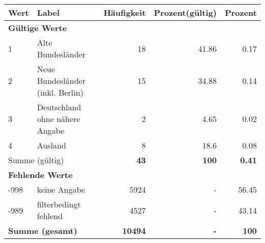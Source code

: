      \begin{longtable}{lXrrr}
     \toprule
     \textbf{Wert} & \textbf{Label} & \textbf{Häufigkeit} & \textbf{Prozent(gültig)} & \textbf{Prozent} \\
     \endhead
     \midrule
     \multicolumn{5}{l}{\textbf{Gültige Werte}}\\

     1 &
     \multicolumn{1}{X}{ Alte Bundesländer   } &


       \num{18} &
       \num[round-mode=places,round-precision=2]{41.86} &
         \num[round-mode=places,round-precision=2]{0.17} \\

     2 &
     \multicolumn{1}{X}{ Neue Bundesländer (inkl. Berlin)   } &


       \num{15} &
       \num[round-mode=places,round-precision=2]{34.88} &
         \num[round-mode=places,round-precision=2]{0.14} \\

     3 &
     \multicolumn{1}{X}{ Deutschland ohne nähere Angabe   } &


       \num{2} &
       \num[round-mode=places,round-precision=2]{4.65} &
         \num[round-mode=places,round-precision=2]{0.02} \\

     4 &
     \multicolumn{1}{X}{ Ausland   } &


       \num{8} &
       \num[round-mode=places,round-precision=2]{18.6} &
         \num[round-mode=places,round-precision=2]{0.08} \\
     \midrule
     \multicolumn{2}{l}{Summe (gültig)} &
       \textbf{\num{43}} &
     \textbf{\num{100}} &
       \textbf{\num[round-mode=places,round-precision=2]{0.41}} \\
     \multicolumn{5}{l}{\textbf{Fehlende Werte}}\\
       -998 &
       keine Angabe &
         \num{5924} &
        - &
         \num[round-mode=places,round-precision=2]{56.45} \\
       -989 &
       filterbedingt fehlend &
         \num{4527} &
        - &
         \num[round-mode=places,round-precision=2]{43.14} \\
     \midrule
     \multicolumn{2}{l}{\textbf{Summe (gesamt)}} &
          \textbf{\num{10494}} &
        \textbf{-} &
        \textbf{\num{100}} \\
     \bottomrule
     \end{longtable}
     
